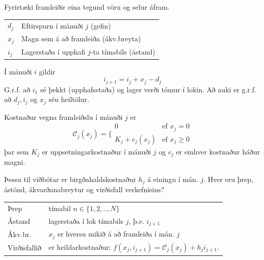 \begin{daemi}[Lagerhald]
  Fyrirtæki framleiðir eina tegund vöru og selur áfram.
  \begin{center}\begin{tabular}{ll}
    $d_j$ & Eftirspurn í mánuði $j$ (gefin) \\
    $x_j$ & Magn sem á að framleiða (ákv.breyta) \\
    $i_j$ & Lagerstaða í upphafi $j$-ta tímabils (ástand)
  \end{tabular}\end{center}
Í mánuði $i$ gildir
$$i_{j+1}=i_j+x_j-d_j$$
G.r.f. að $i_1$ sé þekkt (upphafsstaða) og lager verði tómur í lokin. Að auki er g.r.f. að $d_j,i_j$ og $x_j$ séu heiltölur.

Kostnaður vegna framleiðslu í mánuði $j$ er
$$ \mathcal{C}_j(x_j)=\Bigg\{\begin{array}{cl} 0 & \mbox{ef } x_j=0\\ K_j+c_j(x_j) & \mbox{ef } x_j\geq0\end{array}$$
þar sem $K_j$ er uppsetningarkostnaður í mánuði $j$ og $c_j$ er einhver kostnaður háður  magni.

Þessu til viðbótar er birgðahaldskostnaður $h_j$ á einingu í mán. $j$. 
Hver eru þrep, ástönd, ákvarðanabreytur og virðisfall verkefnisins?
\end{daemi}
\begin{lausn}\hspace{.1cm}

\begin{center}  \begin{tabular}{lp{10cm}}
    Þrep &  tímabil $n\in\{1,2,..,N\}$ \\
    Ástand & lagerstaða í lok tímabils $j$, þ.e. $i_{j+1}$ \\
    Ákv.br. & $x_j$ er hversu mikið á að framleiða í mán. $j$ \\
    Virðisfallið & er heildarkostnaður: $ f(x_j,i_{j+1})=\mathcal{C}_j(x_j)+h_ji_{j+1}.$
  \end{tabular}\end{center}
\end{lausn}

